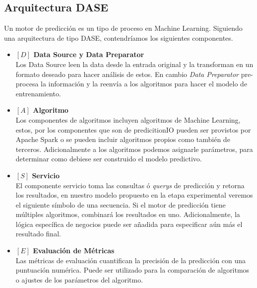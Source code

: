 \subsection{Arquitectura DASE}


Un motor de predicción es un tipo de proceso en Machine Learning. Siguiendo una arquitectura de tipo {DASE}, contendríamos los siguientes componentes.



\begin{itemize}

  \item\label{dase-datasource} \textbf{ $[D]$ Data Source y Data Preparator }\\
  Los Data Source leen la data desde la entrada original y la transforman en un formato deseado para hacer análisis de estos. En cambio \emph{Data Preparator} pre-procesa la información y la reenvía a los algoritmos para   hacer el modelo de entrenamiento.


    \item\label{dase-algoritmo} \textbf{ $[A]$ Algoritmo}\\
  Los componentes de algoritmos incluyen algoritmos de Machine Learning, estos, por los componentes que son de predicitionIO pueden ser provistos por Apache Spark o se pueden incluir algoritmos propios como también de terceros.
  Adicionalmente a los algoritmos podemos asignarle parámetros, para determinar como debiese ser construido el modelo predictivo.



    \item\label{dase-servicio} \textbf{ $[S]$ Servicio}\\
    El componente servicio toma las consultas ó \emph{querys} de predicción y retorna los resultados, en nuestro modelo propuesto en la etapa experimental veremos el siguiente símbolo de una secuencia. 
    Si el motor de predicción tiene múltiples algoritmos, combinará los resultados en uno. Adicionalmente, la lógica específica de negocios puede ser añadida para especificar aún más el resultado final. 
 
    \item\label{dase-eval} \textbf{ $[E]$ Evaluación de Métricas}\\
Las métricas de evaluación cuantifican la precisión de la predicción con una puntuación numérica. Puede ser utilizado para la comparación de algoritmos o ajustes de los parámetros del algoritmo.
\end{itemize}



